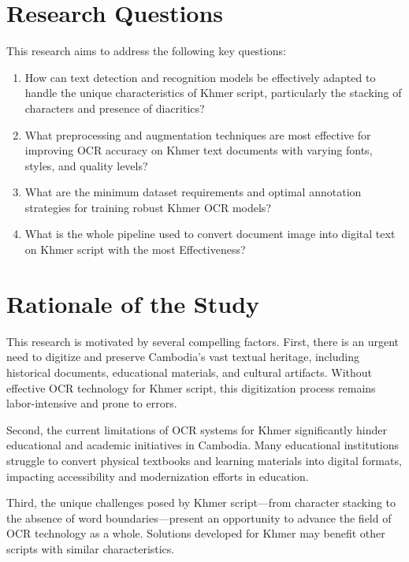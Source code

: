 \section{Research Questions}
\label{sec:questions}

This research aims to address the following key questions:

\begin{enumerate}
    \item How can text detection and recognition models be effectively adapted to handle the unique characteristics of Khmer script, particularly the stacking of characters and presence of diacritics?
    
    \item What preprocessing and augmentation techniques are most effective for improving OCR accuracy on Khmer text documents with varying fonts, styles, and quality levels?

    \item What are the minimum dataset requirements and optimal annotation strategies for training robust Khmer OCR models?
    
    \item What is the whole pipeline used to convert document image into digital text on Khmer script with the most Effectiveness?
\end{enumerate}

\section{Rationale of the Study}
\label{sec:rationale}
       This research is motivated by several compelling factors. First, there is an urgent need to digitize and preserve Cambodia's vast textual heritage, including historical documents, educational materials, and cultural artifacts. Without effective OCR technology for Khmer script, this digitization process remains labor-intensive and prone to errors.

Second, the current limitations of OCR systems for Khmer significantly hinder educational and academic initiatives in Cambodia. Many educational institutions struggle to convert physical textbooks and learning materials into digital formats, impacting accessibility and modernization efforts in education.

Third, the unique challenges posed by Khmer script—from character stacking to the absence of word boundaries—present an opportunity to advance the field of OCR technology as a whole. Solutions developed for Khmer may benefit other scripts with similar characteristics.

